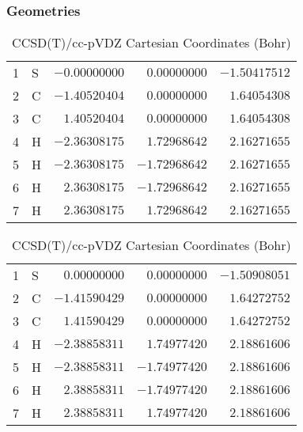 \documentclass[10pt,oneside]{article}
\begin{document}
\clearpage

\subsection{}

\begin{table}[h!]
\subsubsection*{Geometries}
\begin{multicols}{2}
\centering
\caption{CCSD(T)/cc-pVTZ Cartesian Coordinates (Bohr)}
\begin{tabular}{llrrr}
\toprule
1  & S  & $-0.00000000$ & $ 0.00000000$ & $-1.50417512$ \\
2  & C  & $-1.40520404$ & $ 0.00000000$ & $ 1.64054308$ \\
3  & C  & $ 1.40520404$ & $ 0.00000000$ & $ 1.64054308$ \\
4  & H  & $-2.36308175$ & $ 1.72968642$ & $ 2.16271655$ \\
5  & H  & $-2.36308175$ & $-1.72968642$ & $ 2.16271655$ \\
6  & H  & $ 2.36308175$ & $-1.72968642$ & $ 2.16271655$ \\
7  & H  & $ 2.36308175$ & $ 1.72968642$ & $ 2.16271655$ \\
\bottomrule
\end{tabular}
\caption{CCSD(T)/cc-pVDZ Cartesian Coordinates (Bohr)}
\begin{tabular}{llrrr}
\toprule
1  & S  & $ 0.00000000$ & $ 0.00000000$ & $-1.50908051$ \\
2  & C  & $-1.41590429$ & $ 0.00000000$ & $ 1.64272752$ \\
3  & C  & $ 1.41590429$ & $ 0.00000000$ & $ 1.64272752$ \\
4  & H  & $-2.38858311$ & $ 1.74977420$ & $ 2.18861606$ \\
5  & H  & $-2.38858311$ & $-1.74977420$ & $ 2.18861606$ \\
6  & H  & $ 2.38858311$ & $-1.74977420$ & $ 2.18861606$ \\
7  & H  & $ 2.38858311$ & $ 1.74977420$ & $ 2.18861606$ \\
\bottomrule
\end{tabular}
\end{multicols}
\end{table}
\end{document}
